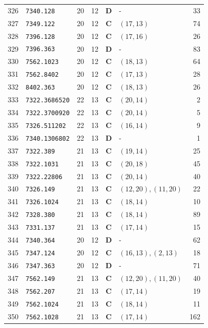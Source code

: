 \documentclass[11pt,a4paper]{article}
\begin{document}
\begin{small}
\begin{longtable}{r l c c c l r}
326 & \texttt{7340.128} & 20 & 12 & \textbf{D} & - & 33 \\
327 & \texttt{7349.122} & 20 & 12 & \textbf{C} & $(17,13)$ & 74 \\
328 & \texttt{7396.128} & 20 & 12 & \textbf{C} & $(17,16)$ & 26 \\
329 & \texttt{7396.363} & 20 & 12 & \textbf{D} & - & 83 \\
330 & \texttt{7562.1023} & 20 & 12 & \textbf{C} & $(18,13)$ & 64 \\
331 & \texttt{7562.8402} & 20 & 12 & \textbf{C} & $(17,13)$ & 28 \\
332 & \texttt{8402.363} & 20 & 12 & \textbf{C} & $(18,13)$ & 26 \\
333 & \texttt{7322.3686520} & 22 & 13 & \textbf{C} & $(20,14)$ & 2 \\
334 & \texttt{7322.3700920} & 22 & 13 & \textbf{C} & $(20,14)$ & 5 \\
335 & \texttt{7326.511202} & 22 & 13 & \textbf{C} & $(16,14)$ & 9 \\
336 & \texttt{7340.1306802} & 22 & 13 & \textbf{D} & - & 1 \\
337 & \texttt{7322.389} & 21 & 13 & \textbf{C} & $(19,14)$ & 25 \\
338 & \texttt{7322.1031} & 21 & 13 & \textbf{C} & $(20,18)$ & 45 \\
339 & \texttt{7322.22806} & 21 & 13 & \textbf{C} & $(20,14)$ & 40 \\
340 & \texttt{7326.149} & 21 & 13 & \textbf{C} & $(12,20), (11,20)$ & 22 \\
341 & \texttt{7326.1024} & 21 & 13 & \textbf{C} & $(18,14)$ & 10 \\
342 & \texttt{7328.380} & 21 & 13 & \textbf{C} & $(18,14)$ & 89 \\
343 & \texttt{7331.137} & 21 & 13 & \textbf{C} & $(17,14)$ & 15 \\
344 & \texttt{7340.364} & 20 & 12 & \textbf{D} & - & 62 \\
345 & \texttt{7347.124} & 20 & 12 & \textbf{C} & $(16,13), (2,13)$ & 18 \\
346 & \texttt{7347.363} & 20 & 12 & \textbf{D} & - & 71 \\
347 & \texttt{7562.149} & 21 & 13 & \textbf{C} & $(12,20), (11,20)$ & 40 \\
348 & \texttt{7562.207} & 21 & 13 & \textbf{C} & $(17,14)$ & 19 \\
349 & \texttt{7562.1024} & 21 & 13 & \textbf{C} & $(18,14)$ & 11 \\
350 & \texttt{7562.1028} & 21 & 13 & \textbf{C} & $(17,14)$ & 162 \\

\end{longtable}
\end{small}
\end{document}
